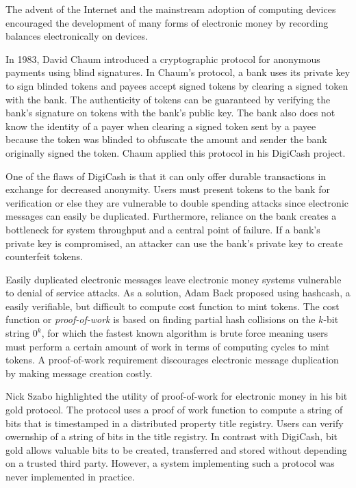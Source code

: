 The advent of the Internet and the mainstream adoption of computing devices
encouraged the development of many forms of electronic money by recording
balances electronically on devices.

In 1983, David Chaum introduced a cryptographic protocol for anonymous payments using
blind signatures. In Chaum's protocol, a bank uses its private key to sign
blinded tokens and payees accept signed tokens by clearing a
signed token with the bank\cite{blindsignatures}. The authenticity of tokens can
be guaranteed by verifying the bank's signature on tokens with the bank's public
key. The bank also does not know the identity of a payer when clearing a signed
token sent by a payee because the token was blinded to obfuscate the amount and sender the bank
originally signed the token. Chaum applied this protocol in his DigiCash project.

One of the flaws of DigiCash is that it can only offer durable
transactions in exchange for decreased anonymity. Users must present tokens to
the bank for verification or else they are vulnerable to double spending attacks
since electronic messages can easily be duplicated\cite{camp1995}. Furthermore,
reliance on the bank creates a bottleneck for system throughput and a central
point of failure. If a bank's private key is compromised, an attacker can use
the bank's private key to create counterfeit tokens.

Easily duplicated electronic messages leave electronic money systems vulnerable
to denial of service attacks. As a solution, Adam Back proposed using hashcash, a
easily verifiable, but difficult to compute cost function to mint
tokens\cite{hashcash}. The cost function or \textit{proof-of-work} is based on finding partial hash
collisions on the $k$-bit string $0^{k}$, for which the fastest known algorithm
is brute force meaning users must perform a certain amount of work in terms of
computing cycles to mint tokens. A proof-of-work requirement discourages
electronic message duplication by making message creation costly.

Nick Szabo highlighted the utility of proof-of-work for electronic money in his bit gold protocol. The protocol
uses a proof of work function to compute a string of bits that is timestamped in a distributed property title registry\cite{bitgold}. Users can
verify owernship of a string of bits in the title registry. In contrast with
DigiCash, bit gold allows valuable bits to be created,
transferred and stored without depending on a trusted third party. However, a
system implementing such a protocol was never implemented in practice.

